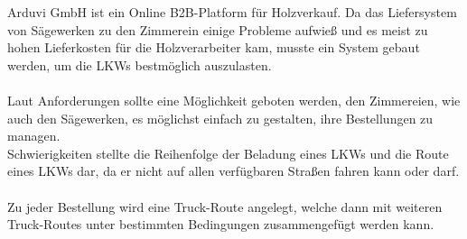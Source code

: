 Arduvi GmbH ist ein Online B2B-Platform für Holzverkauf. Da das Liefersystem von Sägewerken zu den 
Zimmerein einige Probleme aufwieß und es meist zu hohen Lieferkosten für die Holzverarbeiter kam, musste ein
System gebaut werden, um die LKWs bestmöglich auszulasten.
\\\\
Laut Anforderungen sollte eine Möglichkeit geboten werden, den Zimmereien, wie auch den Sägewerken, 
es möglichst einfach zu gestalten, ihre Bestellungen zu managen.
\\
Schwierigkeiten stellte die Reihenfolge der Beladung eines LKWs und die Route eines LKWs dar, da er nicht auf
allen verfügbaren Straßen fahren kann oder darf.
\\\\
Zu jeder Bestellung wird eine Truck-Route angelegt, welche dann mit weiteren Truck-Routes
unter bestimmten Bedingungen zusammengefügt werden kann.